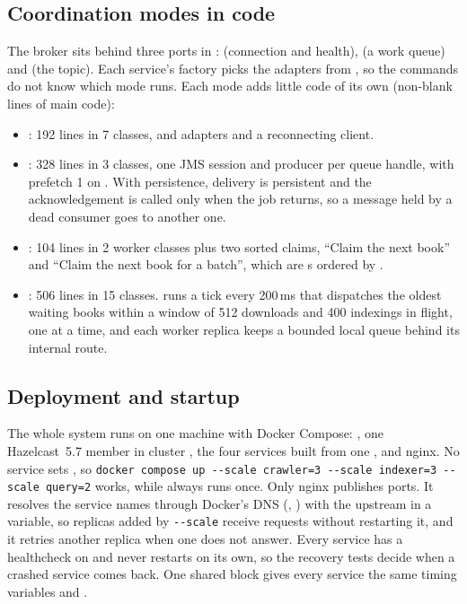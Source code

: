\subsection{Coordination modes in code}

The broker sits behind three ports in :  (connection and health),  (a work
queue) and  (the topic). Each service's factory picks the adapters from
, so the commands do not know which mode runs. Each mode adds little code of its own
(non-blank lines of main code):
\begin{itemize}
\item {}: 192 lines in 7 classes,  and  adapters and a reconnecting client.
\item {}: 328 lines in 3 classes, one JMS session and producer per queue handle, with prefetch 1 on
  . With persistence, delivery is persistent and the acknowledgement is called only when the
  job returns, so a message held by a dead consumer goes to another one.
\item {}: 104 lines in 2 worker classes plus two sorted claims, ``Claim the next book'' and ``Claim the next
  book for a batch'', which are s ordered by .
\item {}: 506 lines in 15 classes.  runs a tick every 200\,ms that dispatches the
  oldest waiting books within a window of 512 downloads and 400 indexings in flight, one  at a time, and
  each worker replica keeps a bounded local queue behind its internal route.
\end{itemize}

\subsection{Deployment and startup}

The whole system runs on one machine with Docker Compose: , one Hazelcast~5.7 member in cluster
, the four services built from one , and nginx. No service sets
, so \texttt{docker compose up -{}-scale crawler=3 -{}-scale indexer=3 -{}-scale query=2} works,
while  always runs once. Only nginx publishes ports. It resolves the service names through Docker's DNS
(, ) with the upstream in a variable, so replicas added by \texttt{-{}-scale} receive
requests without restarting it, and it retries another replica when one does not answer. Every service has a
healthcheck on  and never restarts on its own, so the recovery tests decide when a crashed service comes
back. One shared block gives every service the same timing variables and .

